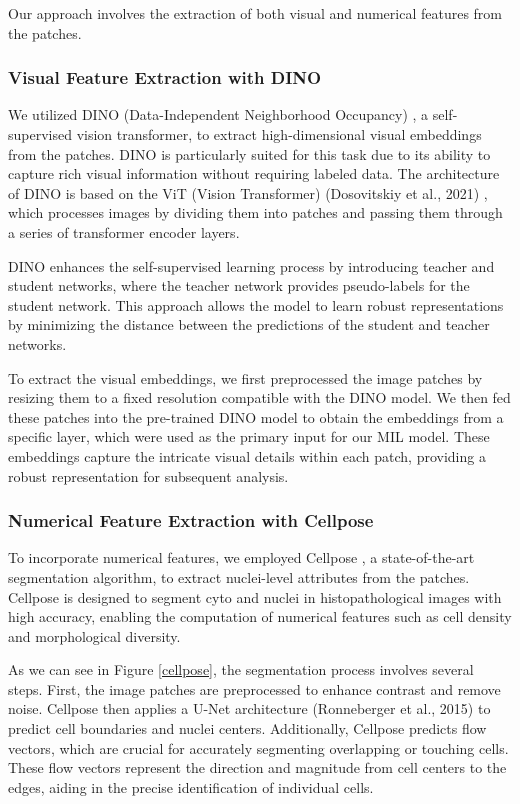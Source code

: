 \documentclass[10pt,twocolumn]{article}
\begin{document}
Our approach involves the extraction of both visual and numerical features from the patches.

\subsubsection{Visual Feature Extraction with DINO}

We utilized DINO (Data-Independent Neighborhood Occupancy) \cite{caron2021emerging}, a self-supervised vision transformer, to extract high-dimensional visual embeddings from the patches. DINO is particularly suited for this task due to its ability to capture rich visual information without requiring labeled data. The architecture of DINO is based on the ViT (Vision Transformer) (Dosovitskiy et al., 2021) \cite{dosovitskiy2021imageworth16x16words}, which processes images by dividing them into patches and passing them through a series of transformer encoder layers. 

DINO enhances the self-supervised learning process by introducing teacher and student networks, where the teacher network provides pseudo-labels for the student network. This approach allows the model to learn robust representations by minimizing the distance between the predictions of the student and teacher networks. 

To extract the visual embeddings, we first preprocessed the image patches by resizing them to a fixed resolution compatible with the DINO model. We then fed these patches into the pre-trained DINO model to obtain the embeddings from a specific layer, which were used as the primary input for our MIL model. These embeddings capture the intricate visual details within each patch, providing a robust representation for subsequent analysis.

\subsubsection{Numerical Feature Extraction with Cellpose}

To incorporate numerical features, we employed Cellpose \cite{stringer2021cellpose}, a state-of-the-art segmentation algorithm, to extract nuclei-level attributes from the patches. Cellpose is designed to segment cyto and nuclei in histopathological images with high accuracy, enabling the computation of numerical features such as cell density and morphological diversity.

As we can see in Figure \ref{cellpose}, the segmentation process involves several steps. First, the image patches are preprocessed to enhance contrast and remove noise. Cellpose then applies a U-Net architecture (Ronneberger et al., 2015)\cite{ronneberger2015unetconvolutionalnetworksbiomedical} to predict cell boundaries and nuclei centers. Additionally, Cellpose predicts flow vectors, which are crucial for accurately segmenting overlapping or touching cells. These flow vectors represent the direction and magnitude from cell centers to the edges, aiding in the precise identification of individual cells.
\end{document}

